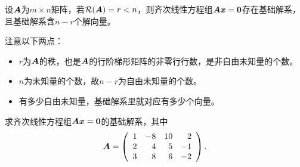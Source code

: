 \begin{frame}
\begin{dingli}
  设$\boldsymbol{A}$为$m\times n$矩阵，若$\mathcal{R}(\boldsymbol{A})=r<n$，则齐次线性方程组$\MA\vx=\M0$存在基础解系，
  且基础解系含$n-r$个解向量。
\end{dingli} \vspace{0.2in} \pause 

\begin{zhu}
  注意以下两点：
  \begin{itemize}
  \item $r$为$\boldsymbol{A}$的秩，也是$\boldsymbol{A}$的行阶梯形矩阵的非零行行数，是非自由未知量的个数。 \\[0.1in]
  \item $n$为未知量的个数，故$n-r$为自由未知量的个数。 \\[0.1in]
  \item[] 有多少自由未知量，基础解系里就对应有多少个向量。
  \end{itemize}
\end{zhu}
\end{frame}

\begin{frame}
\begin{li}
  求齐次线性方程组$\MA\vx=\M0$的基础解系，其中
  $$
  \boldsymbol{A} = \left(
    \begin{array}{rrrr}
      1&-8&10&2\\
      2&4&5&-1\\
      3&8&6&-2
    \end{array}
  \right).
  $$
\end{li} 
\end{frame}

